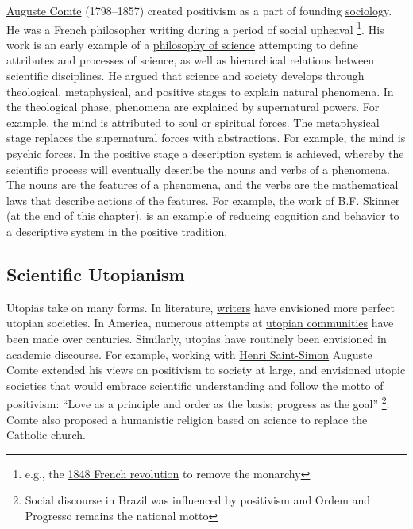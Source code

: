 \documentclass[
  oneside,
  12pt]{crumpbook}
\begin{document}
\href{https://plato.stanford.edu/entries/comte/}{Auguste Comte} (1798--1857) created positivism as a part of founding \href{https://en.wikipedia.org/wiki/Sociology}{sociology}. He was a French philosopher writing during a period of social upheaval \footnote{e.g., the \href{https://en.wikipedia.org/wiki/Revolutions_of_1848}{1848 French revolution} to remove the monarchy}. His work is an early example of a \href{https://en.wikipedia.org/wiki/Philosophy_of_science}{philosophy of science} attempting to define attributes and processes of science, as well as hierarchical relations between scientific disciplines. He argued that science and society develops through theological, metaphysical, and positive stages to explain natural phenomena. In the theological phase, phenomena are explained by supernatural powers. For example, the mind is attributed to soul or spiritual forces. The metaphysical stage replaces the supernatural forces with abstractions. For example, the mind is psychic forces. In the positive stage a description system is achieved, whereby the scientific process will eventually describe the nouns and verbs of a phenomena. The nouns are the features of a phenomena, and the verbs are the mathematical laws that describe actions of the features. For example, the work of B.F. Skinner (at the end of this chapter), is an example of reducing cognition and behavior to a descriptive system in the positive tradition.

\hypertarget{scientific-utopianism}{%
\subsection{Scientific Utopianism}\label{scientific-utopianism}}

Utopias take on many forms. In literature, \href{https://en.wikipedia.org/wiki/List_of_utopian_literature}{writers} have envisioned more perfect utopian societies. In America, numerous attempts at \href{https://en.wikipedia.org/wiki/List_of_American_utopian_communities}{utopian communities} have been made over centuries. Similarly, utopias have routinely been envisioned in academic discourse. For example, working with \href{https://en.wikipedia.org/wiki/Henri_de_Saint-Simon}{Henri Saint-Simon} Auguste Comte extended his views on positivism to society at large, and envisioned utopic societies that would embrace scientific understanding and follow the motto of positivism: ``Love as a principle and order as the basis; progress as the goal'' \footnote{Social discourse in Brazil was influenced by positivism and Ordem and Progresso remains the national motto}. Comte also proposed a humanistic religion based on science to replace the Catholic church.
\end{document}
